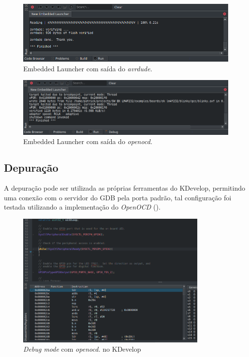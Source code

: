 \begin{figure}[!htb]
  \centering
  \caption[\textit{Embedded Launcher} com \textit{avrdude}]{Embedded Launcher com saída do \textit{avrdude.}}
  \label{fig:runavrdude}
  \includegraphics[width=1\textwidth]{figuras/runavrdude.png}
\end{figure}

\begin{figure}[!htb]
  \centering
  \caption[\textit{Embedded Launcher} com \textit{openocd}]{Embedded Launcher com saída do \textit{openocd.}}
  \label{fig:runopenocd}
  \includegraphics[width=1\textwidth]{figuras/runopenocd.png}
\end{figure}

\subsection{Depuração}

A depuração pode ser utilizada as próprias ferramentas do KDevelop, permitindo uma conexão com o servidor do GDB pela porta padrão, tal configuração foi testada utilizando a implementação do \textit{OpenOCD} ().

\begin{figure}[!htb]
  \centering
  \caption[\textit{Debug mode} com \textit{openocd} no KDevelop]{\textit{Debug mode} com \textit{openocd.} no KDevelop}
  \label{fig:openocddebug}
  \includegraphics[width=0.85\textwidth]{figuras/DEBUG.png}
\end{figure}
